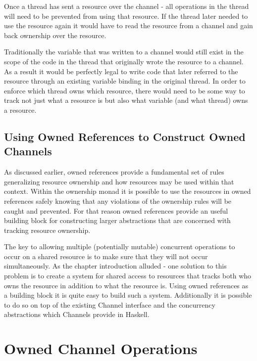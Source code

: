 \documentclass[onehalf,11pt]{beavtex}
\begin{document}
Once a thread has sent a resource over the channel - all operations in the thread
will need to be prevented from using that resource.
If the thread later needed to use the resource again it would have to read the
resource from a channel and gain back ownership over the resource.

Traditionally the variable that was written to a channel would still exist in the
scope of the code in the thread that originally wrote the resource to a channel.
As a result it would be perfectly legal to write code that later referred to the
resource through an existing variable binding in the original thread.
In order to enforce which thread owns which resource, there would need to be
some way to track not just what a resource is but also what variable (and what
thread) owns a resource.

\subsection{Using Owned References to Construct Owned Channels}

As discussed earlier, owned references provide a fundamental set of
rules generalizing resource ownership and how resources may be used within that
context.  Within the ownership monad it is possible to use the
resources in owned references safely knowing that any violations of
the ownership rules will be caught and prevented.  For that reason
owned references provide an useful building block for constructing
larger abstractions that are concerned with tracking resource ownership.

The key to allowing multiple (potentially mutable) concurrent operations to occur
on a shared resource is to make sure that they will not occur simultaneously.
As the chapter introduction alluded - one solution to this problem is to
create a system for shared access to resources that tracks both who owns the
resource in addition to what the resource is.
Using owned references as a building block it is quite easy to build
such a system. Additionally it is possible to do so on top of the existing
Channel interface and the concurrency abstractions which Channels provide in
Haskell.


\section{Owned Channel Operations}
\end{document}
